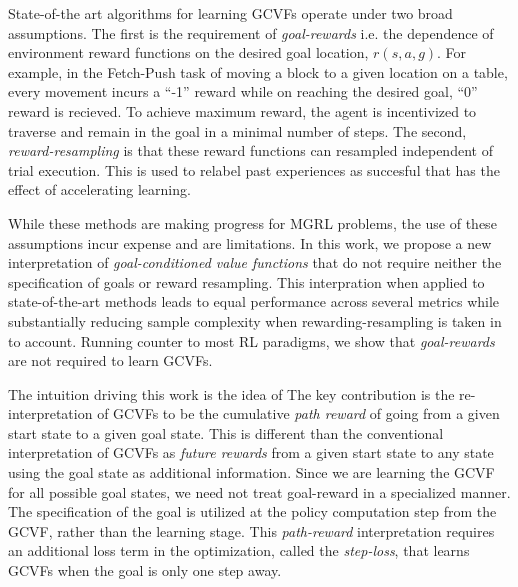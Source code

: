 State-of-the art algorithms for learning GCVFs
\cite{andrychowicz2017hindsight, pong2018temporal} operate under two
broad assumptions. The first is the requirement of \emph{goal-rewards}
i.e. the dependence of environment reward
functions on the desired goal location, $r(s,a,g)$.
For example, in the Fetch-Push task \citep{plappert2018multi} of moving
a block to a given location on a table, every movement incurs a ``-1''
reward while on reaching the desired goal, ``0'' reward is recieved.  To
achieve maximum reward, the agent is incentivized to traverse and remain
in the goal in a minimal number of steps.  The second,
\emph{reward-resampling} is that these
reward functions can resampled independent of trial execution. 
This is used to relabel past experiences as succesful that has the
effect of accelerating learning. 

While these methods are making progress for MGRL problems, the use of
these assumptions incur expense and are limitations. In this work, we
propose a new interpretation of \emph{goal-conditioned value functions}
that do not require neither the specification of goals or reward resampling.
This interpration when applied to state-of-the-art methods leads to
equal performance across several metrics while substantially reducing sample
complexity when rewarding-resampling is taken in to account. Running
counter to most RL paradigms, we show that \emph{goal-rewards} are not
required to learn GCVFs.  

The intuition driving this work is the idea of 
The key contribution is the re-interpretation of GCVFs to
be the cumulative \emph{path reward} of going from a given start state
to a given goal state.  This is different than the conventional
interpretation of GCVFs as \emph{future rewards} from a given start
state to any state using the goal state as additional information.
Since we are learning the GCVF for all possible goal states, we need not
treat goal-reward in a specialized manner. The specification of the goal
is utilized at the policy computation step from the GCVF, rather than
the learning stage. This \emph{path-reward} interpretation requires an
additional loss term in the optimization, called the \emph{step-loss},
that learns GCVFs when the goal is only one step away. 

